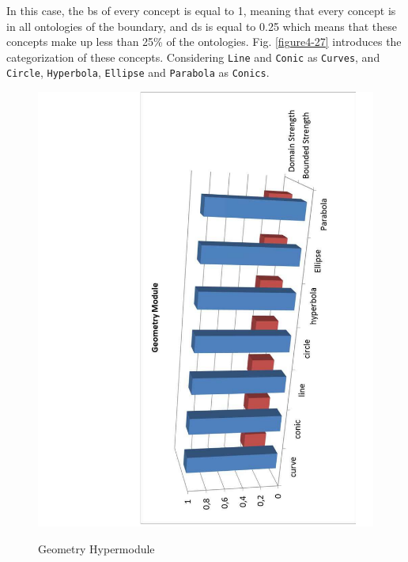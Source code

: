 In this case, the \gls{bs} of every concept is equal to 1, meaning that every concept is in all ontologies of the boundary, and  \gls{ds} is equal to 0.25 which means that these concepts make up less than 25\% of the ontologies. Fig. \ref{figure4-27} introduces the categorization of these concepts. Considering \texttt{Line} and \texttt{Conic} as \texttt{Curves}, and \texttt{Circle}, \texttt{Hyperbola}, \texttt{Ellipse} and \texttt{Parabola} as \texttt{Conics}. 



\begin{figure}
\begin{center}
	\includegraphics[scale=0.5, angle=-90]{figure-chapterIV/fig4-26}\\
	\caption{Geometry Hypermodule}
	\label{figure4-26}
\end{center}
\end{figure}





